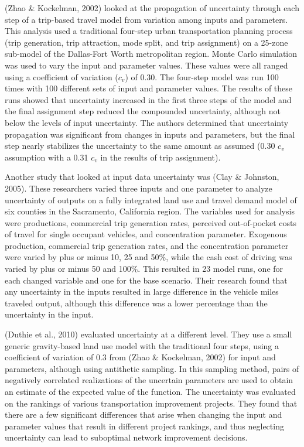 \documentclass[
  letterpaper,
  number,
  review,
  3p]{elsarticle}
\begin{document}
(Zhao \& Kockelman, 2002) looked at the propagation of uncertainty
through each step of a trip-based travel model from variation among
inputs and parameters. This analysis used a traditional four-step urban
transportation planning process (trip generation, trip attraction, mode
split, and trip assignment) on a 25-zone sub-model of the Dallas-Fort
Worth metropolitan region. Monte Carlo simulation was used to vary the
input and parameter values. These values were all ranged using a
coefficient of variation (\(c_v\)) of 0.30. The four-step model was run
100 times with 100 different sets of input and parameter values. The
results of these runs showed that uncertainty increased in the first
three steps of the model and the final assignment step reduced the
compounded uncertainty, although not below the levels of input
uncertainty. The authors determined that uncertainty propagation was
significant from changes in inputs and parameters, but the final step
nearly stabilizes the uncertainty to the same amount as assumed (0.30
\(c_v\) assumption with a 0.31 \(c_v\) in the results of trip
assignment).

Another study that looked at input data uncertainty was (Clay \&
Johnston, 2005). These researchers varied three inputs and one parameter
to analyze uncertainty of outputs on a fully integrated land use and
travel demand model of six counties in the Sacramento, California
region. The variables used for analysis were productions, commercial
trip generation rates, perceived out-of-pocket costs of travel for
single occupant vehicles, and concentration parameter. Exogenous
production, commercial trip generation rates, and the concentration
parameter were varied by plus or minus 10, 25 and 50\%, while the cash
cost of driving was varied by plus or minus 50 and 100\%. This resulted
in 23 model runs, one for each changed variable and one for the base
scenario. Their research found that any uncertainty in the inputs
resulted in large difference in the vehicle miles traveled output,
although this difference was a lower percentage than the uncertainty in
the input.

(Duthie et al., 2010) evaluated uncertainty at a different level. They
use a small generic gravity-based land use model with the traditional
four steps, using a coefficient of variation of 0.3 from (Zhao \&
Kockelman, 2002) for input and parameters, although using antithetic
sampling. In this sampling method, pairs of negatively correlated
realizations of the uncertain parameters are used to obtain an estimate
of the expected value of the function. The uncertainty was evaluated on
the rankings of various transportation improvement projects. They found
that there are a few significant differences that arise when changing
the input and parameter values that result in different project
rankings, and thus neglecting uncertainty can lead to suboptimal network
improvement decisions.
\end{document}
